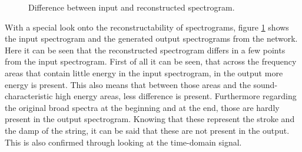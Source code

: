 \begin{figure}[htb!]
    \centering
    \caption{Difference between input and reconstructed spectrogram.}
    \label{fig:res_1D_input_output}
\end{figure}

With a special look onto the reconstructability of spectrograms, figure \ref{fig:res_1D_input_output} shows the input spectrogram and the generated output spectrograms from the network. Here it can be seen that the reconstructed spectrogram differs in a few points from the input spectrogram. First of all it can be seen, that across the frequency areas that contain little energy in the input spectrogram, in the output more energy is present. This also means that between those areas and the sound-characteristic high energy areas, less difference is present. Furthermore regarding the original broad spectra at the beginning and at the end, those are hardly present in the output spectrogram. Knowing that these represent the stroke and the damp of the string, it can be said that these are not present in the output. This is also confirmed through looking at the time-domain signal.

